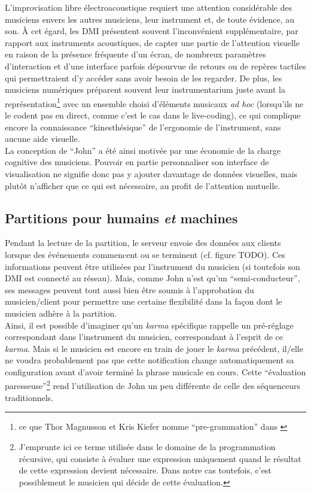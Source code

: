 \noindent L'improvisation libre électroacoustique requiert une attention considérable des musiciens envers les autres musiciens, leur instrument et, de toute évidence, au son. À cet égard, les \gls{DMI} présentent souvent l'inconvénient supplémentaire, par rapport aux instruments acoustiques, de capter une partie de l'attention visuelle en raison de la présence fréquente d'un écran, de nombreux paramètres d'interaction et d'une interface parfois dépourvue de retours ou de repères tactiles qui permettraient d'y accéder sans avoir besoin de les regarder. De plus, les musiciens numériques préparent souvent leur instrumentarium juste avant la représentation\footnote{ce que Thor Magnusson et Kris Kiefer nomme ``pre-grammation'' dans \cite{kiefer_live_2019}} avec un ensemble choisi d'éléments musicaux \textit{ad hoc} (lorsqu'ils ne le codent pas en direct, comme c'est le cas dans le live-coding), ce qui complique encore la connaissance ``kinesthésique'' de l'ergonomie de l'instrument, sans aucune aide visuelle.\\
\indent La conception de ``John'' a été ainsi motivée par une économie de la charge cognitive des musiciens. Pouvoir en partie personnaliser son interface de visualisation ne signifie donc pas y ajouter davantage de données visuelles, mais plutôt n'afficher que ce qui est nécessaire, au profit de l'attention mutuelle.

\subsection{Partitions pour humains \emph{et} machines}
\label{sec:notation:score_for_humans_and_machines}

\noindent Pendant la lecture de la partition, le serveur envoie des données aux clients lorsque des événements commencent ou se terminent (cf. figure TODO). Ces informations peuvent être utilisées par l'instrument du musicien (si toutefois son \gls{DMI} est connecté au réseau). Mais, comme John n'est qu'un ``semi-conducteur'', ses messages peuvent tout aussi bien être soumis à l'approbation du musicien/client pour permettre une certaine flexibilité dans la façon dont le musicien adhère à la partition.\\
\indent Ainsi, il est possible d'imaginer qu'un \textit{karma} spécifique rappelle un pré-réglage correspondant dans l'instrument du musicien, correspondant à l'esprit de ce \textit{karma}. Mais si le musicien est encore en train de jouer le \textit{karma} précédent, il/elle ne voudra probablement pas que cette notification change automatiquement sa configuration avant d'avoir terminé la phrase musicale en cours. Cette ``évaluation paresseuse''\footnote{J'emprunte ici ce terme utilisée dans le domaine de la programmation récursive, qui consiste à évaluer une expression uniquement quand le résultat de cette expression devient nécessaire. Dans notre cas toutefois, c'est possiblement le musicien qui décide de cette évaluation.} rend l'utilisation de John un peu différente de celle des séquenceurs traditionnels.

